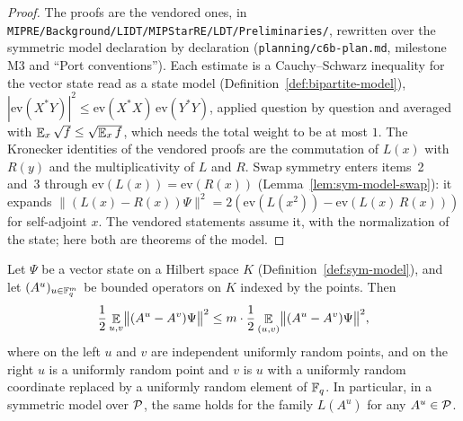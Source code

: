 \begin{proof}
\leanok
The proofs are the vendored ones, in
\texttt{MIPRE/Background/LIDT/MIPStarRE/LDT/Preliminaries/}, rewritten over the symmetric model
declaration by declaration (\texttt{planning/c6b-plan.md}, milestone M3 and ``Port conventions'').
Each estimate is a Cauchy--Schwarz inequality for the vector state read as a state model
(Definition~\ref{def:bipartite-model}), $|\mathrm{ev}(X^* Y)|^2 \leq \mathrm{ev}(X^* X)\,
\mathrm{ev}(Y^* Y)$, applied question by question and averaged with
$\E_x \sqrt{f} \leq \sqrt{\E_x f}$, which needs the total weight to be at most $1$. The Kronecker
identities of the vendored proofs are the commutation of $L(x)$ with $R(y)$ and the multiplicativity
of $L$ and $R$. Swap symmetry enters items~2 and~3 through $\mathrm{ev}(L(x)) = \mathrm{ev}(R(x))$
(Lemma~\ref{lem:sym-model-swap}): it expands $\| (L(x) - R(x)) \Psi \|^2 = 2 (\mathrm{ev}(L(x^2)) -
\mathrm{ev}(L(x)\, R(x)))$ for self-adjoint $x$. The vendored statements assume it, with the
normalization of the state; here both are theorems of the model.
\end{proof}

\begin{lemma}
\label{lem:co-local-to-global}
\leanok
Let $\Psi$ be a vector state on a Hilbert space $K$ (Definition~\ref{def:sym-model}), and let
$(A^u)_{u \in \Fq^m}$ be bounded operators on $K$ indexed by the points. Then
\[
  \frac12 \E_{u, v} \bigl\| (A^u - A^v) \Psi \bigr\|^2 \leq m \cdot \frac12 \E_{(u, v)}
  \bigl\| (A^u - A^v) \Psi \bigr\|^2 ,
\]
where on the left $u$ and $v$ are independent uniformly random points, and on the right $u$ is a
uniformly random point and $v$ is $u$ with a uniformly random coordinate replaced by a uniformly
random element of $\Fq$. In particular, in a symmetric model over $\cal{P}$, the same holds for
the family $L(A^u)$ for any $A^u \in \cal{P}$.
\end{lemma}

